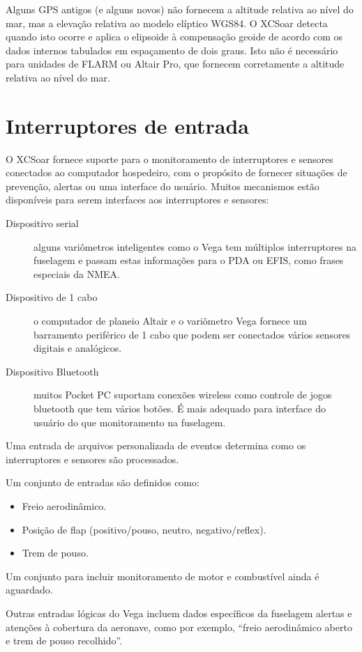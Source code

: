 Alguns GPS antigos (e alguns novos) não fornecem a altitude relativa ao nível do mar, mas a elevação relativa ao modelo elíptico WGS84.  O XCSoar detecta quando isto ocorre e aplica o elipsoide à compensação geoide de acordo com os dados internos tabulados em espaçamento de dois graus.  Isto não é necessário para unidades de FLARM ou Altair Pro, que fornecem corretamente a altitude relativa ao nível do mar.

\section{Interruptores de entrada}

O XCSoar fornece suporte para o monitoramento de interruptores e sensores conectados ao computador hospedeiro, com o propósito de fornecer situações de prevenção, alertas ou uma interface do usuário.  Muitos mecanismos estão disponíveis para serem interfaces aos interruptores e sensores:
\begin{description}
\item[Dispositivo serial]  alguns variômetros inteligentes como o Vega tem múltiplos interruptores na fuselagem e passam estas informações para o PDA ou EFIS, como frases especiais da NMEA.
\item[Dispositivo de 1 cabo]  o computador de planeio Altair e o variômetro Vega fornece um barramento periférico de 1 cabo que podem ser conectados vários sensores digitais e analógicos.
\item[Dispositivo Bluetooth]  muitos Pocket PC suportam conexões wireless como controle de jogos bluetooth que tem vários botões.  É mais adequado para interface do usuário do que monitoramento na fuselagem.
\end{description}

Uma entrada de arquivos personalizada de eventos determina como os interruptores e sensores são processados.

Um conjunto de entradas são definidos como:

\begin{itemize}
\item Freio aerodinâmico.
\item Posição de flap (positivo/pouso, neutro, negativo/reflex).
\item Trem de pouso.
\end{itemize}

Um conjunto para incluir monitoramento de motor e combustível ainda é aguardado.

Outras entradas lógicas do Vega incluem dados específicos da fuselagem alertas e atenções à cobertura da aeronave, como por exemplo, “freio aerodinâmico aberto e trem de pouso recolhido”.

